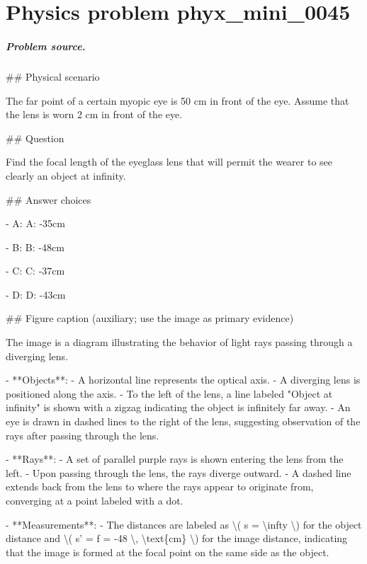 
\chapter{Physics problem phyx\_mini\_0045}
\label{ch:PhyXMiniProblems_problem_phyx_mini_0045}

\paragraph{Problem source.}
\#\# Physical scenario

The far point of a certain myopic eye is 50 cm in front of the eye. Assume that the lens is worn 2 cm in front of the eye.

\#\# Question

Find the focal length of the eyeglass lens that will permit the wearer to see clearly an object at infinity.

\#\# Answer choices

- A: A: -35cm

- B: B: -48cm

- C: C: -37cm

- D: D: -43cm

\#\# Figure caption (auxiliary; use the image as primary evidence)

The image is a diagram illustrating the behavior of light rays passing through a diverging lens. 

- **Objects**: 
  - A horizontal line represents the optical axis.
  - A diverging lens is positioned along the axis.
  - To the left of the lens, a line labeled "Object at infinity" is shown with a zigzag indicating the object is infinitely far away.
  - An eye is drawn in dashed lines to the right of the lens, suggesting observation of the rays after passing through the lens.

- **Rays**:
  - A set of parallel purple rays is shown entering the lens from the left.
  - Upon passing through the lens, the rays diverge outward.
  - A dashed line extends back from the lens to where the rays appear to originate from, converging at a point labeled with a dot.

- **Measurements**:
  - The distances are labeled as \textbackslash{}( s = \textbackslash{}infty \textbackslash{}) for the object distance and \textbackslash{}( s' = f = -48 \textbackslash{}, \textbackslash{}text\{cm\} \textbackslash{}) for the image distance, indicating that the image is formed at the focal point on the same side as the object.

